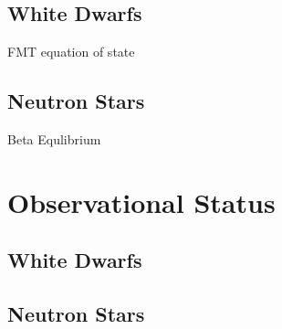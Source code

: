   \subsection{White Dwarfs}

  FMT equation of state
  
  \subsection{Neutron Stars}


  Beta Equlibrium
  \section{Observational Status}

  \subsection{White Dwarfs}

  \subsection{Neutron Stars}

  